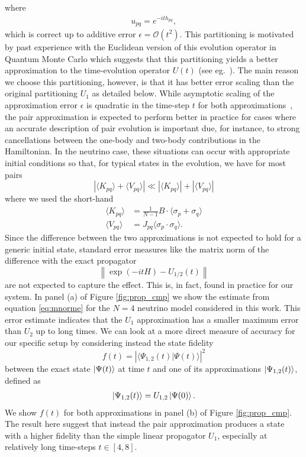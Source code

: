 \documentclass[10pt]{article}
\begin{document}
where
\begin{align}
u_{pq} = e^{-ith_{pq}}
,\end{align}
which is correct up to additive error $\epsilon=\mathcal{O}(t^2)$.
This partitioning is motivated by past experience with the Euclidean version of this evolution operator in Quantum Monte Carlo which suggests that this partitioning yields a better approximation to the time-evolution operator $U(t)$ (see eg.~\cite{Ceperley1995,Carlson2015}). The main reason we choose this partitioning, however, is that it has better error scaling than the original partitioning $U_1$ 
as detailed below. While asymptotic scaling of the approximation error $\epsilon$ is quadratic in the time-step $t$ for both approximations~\cite{Suzuki91}, the pair approximation is expected to perform better in practice for cases where an accurate description of pair evolution is important due, for instance, to strong cancellations between the one-body and two-body contributions in the Hamiltonian. In the neutrino case, these situations can occur with appropriate initial conditions so that, for typical states in the evolution, we have for most pairs
\begin{equation}
\label{eq:pairp_err}
\left|\langle K_{pq}\rangle+\langle V_{pq}\rangle\right|\ll\left|\langle K_{pq}\rangle\right|+\left|\langle V_{pq}\rangle\right|
\end{equation}
where we used the short-hand
\begin{align}
\langle K_{pq}\rangle 
&=
\frac{1}{N-1}B\cdot\langle\sigma_p+\sigma_q\rangle
\\
\langle V_{pq}\rangle
&=
J_{pq}\langle\sigma_p\cdot\sigma_q\rangle
.\end{align}
Since the difference between the two approximations is not expected to hold for a generic initial state, standard error measures like the matrix norm of the difference with the exact propagator
\begin{equation}
\label{eq:mnorme}
\left\|\exp\left(-itH\right)-U_{1/2}(t)\right\|
\end{equation}
are not expected to capture the effect. This is, in fact, found in practice for our system. In panel (a) of Figure \ref{fig:prop_cmp} we show the estimate from equation \eqref{eq:mnorme} for the $N=4$ neutrino model considered in this work. This error estimate indicates that the $U_1$ approximation has a smaller maximum error than $U_2$ up to long times. We can look at a more direct measure of accuracy for our specific setup by considering instead the state fidelity 
\begin{equation}
f(t) = \left|\langle \Psi_{1,2}(t)|\Psi(t)\rangle\right|^2   
\end{equation}
between the exact state $\ket{\Psi(t)}$ at time $t$ and one of its approximations $\ket{\Psi_{1,2}(t)}$, defined as
\begin{align}
\ket{\Psi_{1,2}(t)}=U_{1,2}\ket{\Psi(0)}
.\end{align}
We show $f(t)$ for both approximations in panel (b) of Figure \ref{fig:prop_cmp}. The result here suggest that instead the pair approximation produces a state with a higher fidelity than the simple linear propagator $U_1$, especially at relatively long time-steps $t\in[4,8]$.
\end{document}
